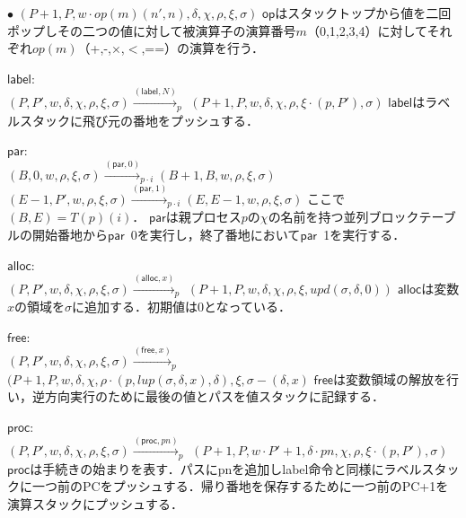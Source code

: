 \documentclass[submit,PRO]{ipsj}
\newcommand{\bcode}[1]{$\mathsf{#1}$}
\begin{document}
\begin{list}{$\bullet$}{}
\qquad $(P+1,P,w\cdot op(m)(n',n),\delta,\chi,\rho,\xi,\sigma)$\newline
\bcode{op}はスタックトップから値を二回ポップしその二つの値に対して被演算子の演算番号$m$（0,1,2,3,4）に対してそれぞれ$op(m)$（+,-,$\times$,$<$,==）の演算を行う．
\item \bcode{label}:\\
$(P,P',w,\delta,\chi,\rho,\xi,\sigma)\xrightarrow{(\mathsf{label},N)}_p$\newline
\qquad$(P+1,P,w,\delta,\chi,\rho,\xi\cdot(p,P'),\sigma)$\newline
\bcode{label}はラベルスタックに飛び元の番地をプッシュする．
\item \bcode{par}:\\
$(B,0,w,\rho,\xi,\sigma)\xrightarrow{(\mathsf{par},0)}_{p\cdot i}(B+1,B,w,\rho,\xi,\sigma)$\newline
$(E-1,P',w,\rho,\xi,\sigma)\xrightarrow{(\mathsf{par},1)}_{p\cdot i}(E,E-1,w,\rho,\xi,\sigma)$\newline
ここで$(B,E)=T(p)(i)$．
\bcode{par}は親プロセス$p$の$\chi$の名前を持つ並列ブロックテーブルの開始番地から\bcode{par}\ 0を実行し，終了番地において\bcode{par}\ 1を実行する．
\item \bcode{alloc}:\\
$(P,P',w,\delta,\chi,\rho,\xi,\sigma)\xrightarrow{(\mathsf{alloc},x)}_p$\newline
\qquad $(P+1,P,w,\delta,\chi,\rho,\xi,upd(\sigma,\delta,0))$\newline
\bcode{alloc}は変数$x$の領域を$\sigma$に追加する．初期値は0となっている．
\item \bcode{free}:\\
$(P,P',w,\delta,\chi,\rho,\xi,\sigma)\xrightarrow{(\mathsf{free},x)}_p$\newline
\qquad $(P+1,P,w,\delta,\chi,\rho\cdot(p,lup(\sigma,\delta,x),\delta),\xi,\sigma-(\delta,x)$\newline
\bcode{free}は変数領域の解放を行い，逆方向実行のために最後の値とパスを値スタックに記録する．
\item \bcode{proc}:\\
$(P,P',w,\delta,\chi,\rho,\xi,\sigma)\xrightarrow{(\mathsf{proc},pn)}_p$\newline
\qquad $(P+1,P,w\cdot P'+1,\delta\cdot pn,\chi,\rho,\xi\cdot(p,P'),\sigma)$\newline
\bcode{proc}は手続きの始まりを表す．パスにpnを追加しlabel命令と同様にラベルスタックに一つ前のPCをプッシュする．帰り番地を保存するために一つ前のPC+1を演算スタックにプッシュする．

\end{list}
\end{document}
